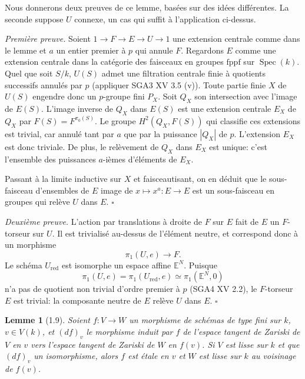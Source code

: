 \documentclass[10pt]{article}
\newcommand{\Spec}{\operatorname{Spec}}
\newcommand{\red}{\mathrm{red}}
\newcommand{\fppf}{\mathrm{fppf}}
\theoremstyle{deligne}
\newtheorem*{lemma*}{Lemme}
\newenvironment{proofone}{\textit{Première preuve.}}{\hfill$\square$}
\newenvironment{prooftwo}{\textit{Deuxième preuve.}}{\hfill$\square$}
\begin{document}
Nous donnerons deux preuves de ce lemme, basées sur des idées différentes. La seconde suppose \(U\) connexe, un cas qui suffit à l'application ci-dessus.

\begin{proofone}
Soient \(1\to F\to E\to U\to1\) une extension centrale comme dans le lemme et \(a\) un entier premier à \(p\) qui annule \(F\). Regardons \(E\) comme une extension centrale dans la catégorie des faisceaux en groupes \(\fppf\) sur \(\Spec(k)\). Quel que soit \(S/k\), \(U(S)\) admet une filtration centrale finie à quotients successifs annulés par \(p\) (appliquer SGA3 XV 3.5 (v)). Toute partie finie \(X\) de \(U(S)\) engendre donc un \(p\)-groupe fini \(P_X\). Soit \(Q_X\) son intersection avec l'image de \(E(S)\). L'image inverse de \(Q_X\) dans \(E(S)\) est une extension centrale \(E_X\) de \(Q_X\) par \(F(S)=F^{\pi_0(S)}\). Le groupe \(H^2(Q_X,F(S))\) qui classifie ces extensions est trivial, car annulé tant par \(a\) que par la puissance \(|Q_X|\) de \(p\). L'extension \(E_X\) est donc triviale. De plus, le relèvement de \(Q_X\) dans \(E_X\) est unique: c'est l'ensemble des puissances \(a\)-ièmes d'éléments de \(E_X\).

Passant à la limite inductive sur \(X\) et faisceautisant, on en déduit que le sous-faisceau d'ensembles de \(E\) image de \(x\mapsto x^a:E\to E\) est un sous-faisceau en groupes qui relève \(U\) dans \(E\).
\end{proofone}

\begin{prooftwo}
L'action par translations à droite de \(F\) sur \(E\) fait de \(E\) un \(F\)-torseur sur \(U\). Il est trivialisé au-dessus de l'élément neutre, et correspond donc à un morphisme
\[
  \pi_1(U,e)\longrightarrow F.
\]
Le schéma \(U_{\red}\) est isomorphe un espace affine \(\mathbb E^N\). Puisque
\[
  \pi_1(U,e)=\pi_1(U_{\red},e)\simeq\pi_1(\mathbb E^N,0)
\]
n'a pas de quotient non trivial d'ordre premier à \(p\) (SGA4 XV 2.2), le \(F\)-torseur \(E\) est trivial: la composante neutre de \(E\) relève \(U\) dans \(E\).
\end{prooftwo}

\begin{lemma*}[1.9]
Soient \(f:V\to W\) un morphisme de schémas de type fini sur \(k\), \(v\in V(k)\), et \((df)_v\) le morphisme induit par \(f\) de l'espace tangent de Zariski de \(V\) en \(v\) vers l'espace tangent de Zariski de \(W\) en \(f(v)\). Si \(V\) est lisse sur \(k\) et que \((df)_v\) un isomorphisme, alors \(f\) est étale en \(v\) et \(W\) est lisse sur \(k\) au voisinage de \(f(v)\).
\end{lemma*}
\end{document}
